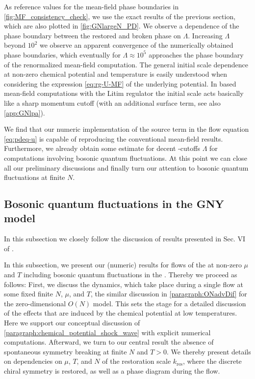 As reference values for the mean-field phase boundaries in \cref{fig:MF_consistency_check}, we use the exact results of the previous section, which are also plotted in \cref{fig:GNlargeN_PD}. We observe a dependence of the phase boundary between the restored and broken phase on $\Lambda$. Increasing $\Lambda$ beyond $10^2$ we observe an apparent convergence of the numerically obtained phase boundaries, which eventually for $\Lambda \approx 10^5$ approaches the phase boundary of the renormalized mean-field computation. The general \uv{} initial scale dependence at non-zero chemical potential and temperature is easily understood when considering the expression \eqref{eq:rg-U-MF} of the underlying \ir{} potential. 
In \frg{} based mean-field computations with the Litim regulator the \uv{} initial scale acts basically like a sharp momentum cutoff (with an additional surface term, see also \cref{app:GNlpa}).
	
We find that our numeric implementation of the source term in the \frg{} flow equation \eqref{eq:pdeq-u} is capable of reproducing the conventional mean-field results. Furthermore, we already obtain some estimate for decent \uv{}-cutoffs $\Lambda$ for computations involving bosonic quantum fluctuations.
At this point we can close all our preliminary discussions and finally turn our attention to bosonic quantum fluctuations at finite $N$.

\subsection{Bosonic quantum fluctuations in the GNY model}
\label{subsec:gnyFiniteNresults}
\begin{disclaimer}
	In this subsection we closely follow the discussion of results presented in Sec. VI of .
\end{disclaimer}
In this subsection, we present our (numeric) results for \frg{} flows of the \gnym{} at non-zero $\mu$ and $T$ including bosonic quantum fluctuations in the \lpa.
Thereby we proceed as follows: First, we discuss the dynamics, which take place during a single \frg{} flow at some fixed finite $N$, $\mu$, and $T$, \cf{} the similar discussion in \cref{paragraph:ONadvDif} for the zero-dimensional $O(N)$ model.
This sets the stage for a detailed discussion of the effects that are induced by the chemical potential at low temperatures.
Here we support our conceptual discussion of \cref{paragraph:chemical_potential_shock_wave} with explicit numerical computations.
Afterward, we turn to our central result \dash{} the absence of spontaneous \ZII{} symmetry breaking at finite $N$ and $T > 0$.
We thereby present details on dependencies on $\mu$, $T$, and $N$ of the restoration scale $k_\mathrm{res}$, where the discrete chiral symmetry is restored, as well as a phase diagram during the \frg{} flow.

